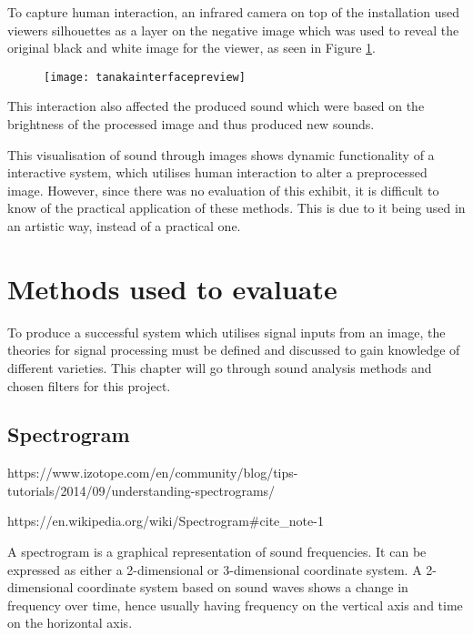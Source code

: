 To capture human interaction, an infrared camera on top of the installation used viewers silhouettes as a layer on the negative image which was used to reveal the original black and white image for the viewer, as seen in Figure \ref{fig:tanakainterfacepreview}.

\begin{figure}[!h]
\centering
\texttt{[image: tanakainterfacepreview]}
\caption{\label{fig:tanakainterfacepreview}\cite{Tanaka2012}}
\end{figure}

This interaction also affected the produced sound which were based on the brightness of the processed image and thus produced new sounds. 

This visualisation of sound through images shows dynamic functionality of a interactive system, which utilises human interaction to alter a preprocessed image. However, since there was no evaluation of this exhibit, it is difficult to know of the practical application of these methods. This is due to it being used in an artistic way, instead of a practical one.   

\section{Methods used to evaluate}\label{sub:methodsusedtoevaluate}

To produce a successful system which utilises signal inputs from an image, the theories for signal processing must be defined and discussed to gain knowledge of different varieties. This chapter will go through sound analysis methods and chosen filters for this project. 

\subsection{Spectrogram}\label{sub:spectrogram}

https://www.izotope.com/en/community/blog/tips-tutorials/2014/09/understanding-spectrograms/

https://en.wikipedia.org/wiki/Spectrogram#cite_note-1

A spectrogram is a graphical representation of sound frequencies. It can be expressed as either a 2-dimensional or 3-dimensional coordinate system. A 2-dimensional coordinate system based on sound waves shows a change in frequency over time, hence usually having frequency on the vertical axis and time on the horizontal axis. 

